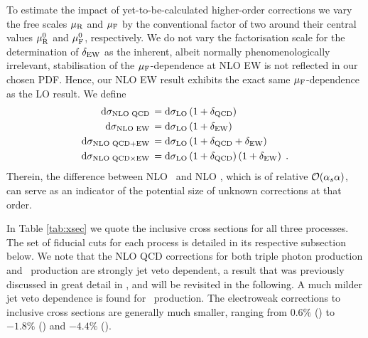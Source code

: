 To estimate the impact of yet-to-be-calculated higher-order 
corrections we vary the free scales $\mu_{\mathrm{R}}$ and $\mu_{\mathrm{F}}$ 
by the conventional factor of two around their central values 
$\mu_{\mathrm{R}}^0$ and $\mu_{\mathrm{F}}^0$, respectively. 
We do not vary the factorisation scale for the determination 
of $\delta_\text{EW}$ as the inherent, albeit normally phenomenologically 
irrelevant, stabilisation of the $\mu_{\mathrm{F}}$-dependence at NLO EW 
is not reflected in our chosen PDF.
Hence, our NLO EW result exhibits the exact same $\mu_{\mathrm{F}}$-dependence 
as the LO result.
We define 
\begin{equation}
  \label{eq:defnlo}
  \begin{split}
    \mathrm{d}\sigma_\text{NLO QCD}
    \,=\;&\mathrm{d}\sigma_\text{LO}\left(1+\delta_\text{QCD}\right)\\
    \mathrm{d}\sigma_\text{NLO EW}
    \,=\;&\mathrm{d}\sigma_\text{LO}\left(1+\delta_\text{EW}\right)\\
    \mathrm{d}\sigma_\text{NLO QCD+EW}
    \,=\;&\mathrm{d}\sigma_\text{LO}\left(1+\delta_\text{QCD}+\delta_\text{EW}\right)\\
    \mathrm{d}\sigma_\text{NLO QCD$\times$EW}
    \,=\;&\mathrm{d}\sigma_\text{LO}\left(1+\delta_\text{QCD}\right)\left(1+\delta_\text{EW}\right)\;.
  \end{split}
\end{equation}
Therein, the difference between NLO \QCDpEW\ and NLO \QCDtEW, which 
is of relative $\mathcal{O}(\alpha_s\alpha)$, can serve as an indicator 
of the potential size of unknown corrections at that order.

In Table \ref{tab:xsec} we quote the inclusive cross sections for all 
three processes. 
The set of fiducial cuts for each process is detailed in its 
respective subsection below. 
We note that the NLO QCD corrections for both triple photon 
production and \aaw\ production are strongly jet veto dependent, 
a result that was previously discussed in great detail in 
\cite{Bozzi:2011en,Bozzi:2011wwa}, and will be revisited in the 
following. 
A much milder jet veto dependence is found for \aaz\ production. 
The electroweak corrections to inclusive cross sections are 
generally much smaller, ranging from $0.6\%$ (\aaa) to $-1.8\%$ (\aaw) 
and $-4.4\%$ (\aaz).

